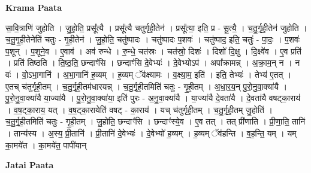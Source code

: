 \documentclass[17pt]{extarticle}
\begin{document}
\textbf{Krama Paata} \newline

सा॒वि॒त्राणि॑ जुहोति । जु॒हो॒ति॒ प्रसू᳚त्यै । प्रसू᳚त्यै चतुर्गृही॒तेन॑ । प्रसू᳚त्या॒ इति॒ प्र - सू॒त्यै॒ । च॒तु॒र्गृ॒ही॒तेन॑ जुहोति । च॒तु॒गृ॒ही॒तेनेति॑ चतुः - गृ॒ही॒तेन॑ । जु॒हो॒ति॒ चतु॑ष्पादः । चतु॑ष्पादः प॒शवः॑ । चतु॑ष्पाद॒ इति॒ चतुः॑ - पा॒दः॒ । प॒शवः॑ प॒शून् । प॒शूने॒व । ए॒वाव॑ । अव॑ रुन्धे । रु॒न्धे॒ चत॑स्रः । चत॑स्रो॒ दिशः॑ । दिशो॑ दि॒क्षु । दि॒क्ष्वे॑व । ए॒व प्रति॑ । प्रति॑ तिष्ठति । ति॒ष्ठ॒ति॒ छन्दाꣳ॑सि । छन्दाꣳ॑सि दे॒वेभ्यः॑ । दे॒वेभ्योऽप॑ । अपा᳚क्रामन्न् । अ॒क्रा॒म॒न् न । न वः॑ । वो॒ऽभा॒गानि॑ । अ॒भा॒गानि॑ ह॒व्यम् । ह॒व्यम् ॅव॑क्ष्यामः । व॒क्ष्या॒म॒ इति॑ । इति॒ तेभ्यः॑ । तेभ्य॑ ए॒तत् । ए॒तच् च॑तुर्गृही॒तम् । च॒तु॒र्गृ॒ही॒तम॑धारयन्न् । च॒तु॒र्गृ॒ही॒तमिति॑ चतुः - गृ॒ही॒तम् । अ॒धा॒र॒य॒न् पु॒रो॒नु॒वा॒क्या॑यै । पु॒रो॒नु॒वा॒क्या॑यै या॒ज्या॑यै । पु॒रो॒नु॒वा॒क्या॑या॒ इति॑ पुरः - अ॒नु॒वा॒क्या॑यै । या॒ज्या॑यै दे॒वता॑यै । दे॒वता॑यै वषट्का॒राय॑ । व॒ष॒ट्का॒राय॒ यत् । व॒ष॒ट्का॒रायेति॑ वषट् - का॒राय॑ । यच् च॑तुर्गृही॒तम् । च॒तु॒र्गृ॒ही॒तम् जु॒होति॑ । च॒तु॒र्गृ॒ही॒तमिति॑ चतुः - गृ॒ही॒तम् । जु॒होति॒ छन्दाꣳ॑सि । छन्दाꣳ॑स्ये॒व । ए॒व तत् । तत् प्री॑णाति । प्री॒णा॒ति॒ तानि॑ । तान्य॑स्य । अ॒स्य॒ प्री॒तानि॑ । प्री॒तानि॑ दे॒वेभ्यः॑ । दे॒वेभ्यो॑ ह॒व्यम् । ह॒व्यम् ॅव॑हन्ति । व॒ह॒न्ति॒ यम् । यम् का॒मये॑त । का॒मये॑त॒ पापी॑यान् \newline

\textbf{Jatai Paata} \newline
\end{document}
